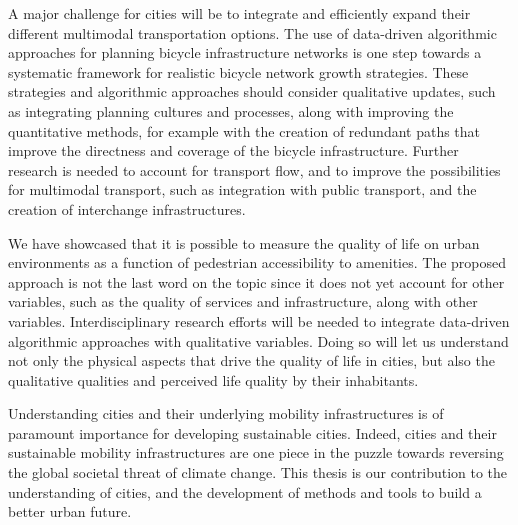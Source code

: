 A major challenge for cities will be to integrate and efficiently expand their different multimodal transportation options. The use of data-driven algorithmic approaches for planning bicycle infrastructure networks is one step towards a systematic framework for realistic bicycle network growth strategies. These strategies and algorithmic approaches should consider  qualitative updates, such as integrating planning cultures and processes, along with improving the quantitative methods, for example with the creation of redundant paths that improve the directness and coverage of the bicycle infrastructure. Further research is needed to account for transport flow, and to improve the possibilities for multimodal transport, such as integration with public transport, and the creation of interchange infrastructures.

We have showcased that it is possible to measure the quality of life on urban environments as a function of pedestrian accessibility to amenities. The proposed approach is not the last word on the topic since it does not yet account for other variables, such as the quality of services and infrastructure, along with other variables. Interdisciplinary research efforts will be needed to integrate data-driven algorithmic approaches with qualitative variables. Doing so will let us understand not only the physical aspects that drive the quality of life in cities, but also the qualitative qualities and perceived life quality by their inhabitants.

Understanding cities and their underlying mobility infrastructures is of paramount importance for developing sustainable cities. Indeed, cities and their sustainable mobility infrastructures are one piece in the puzzle towards reversing the global societal threat of climate change. This thesis is our contribution to the understanding of cities, and the development of methods and tools to build a better urban future. 